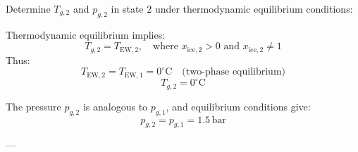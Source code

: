Determine \( T_{g,2} \) and \( p_{g,2} \) in state 2 under thermodynamic equilibrium conditions:  

Thermodynamic equilibrium implies:  
\[
T_{g,2} = T_{\text{EW},2}, \quad \text{where } x_{\text{ice},2} > 0 \text{ and } x_{\text{ice},2} \neq 1
\]  
Thus:  
\[
T_{\text{EW},2} = T_{\text{EW},1} = 0^\circ\text{C} \quad \text{(two-phase equilibrium)}
\]  
\[
T_{g,2} = 0^\circ\text{C}
\]  

The pressure \( p_{g,2} \) is analogous to \( p_{g,1} \), and equilibrium conditions give:  
\[
p_{g,2} = p_{g,1} = 1.5 \, \text{bar}
\]  

---